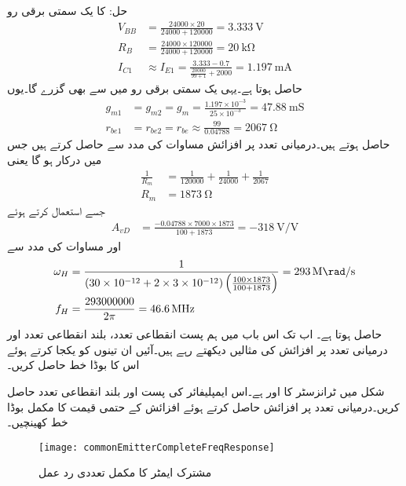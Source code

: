 حل: کا یک سمتی  برقی رو 
\begin{align*}
V_{BB}&=\frac{24000 \times 20}{24000+120000}=\SI{3.333}{\volt}\\
R_B&=\frac{24000 \times 120000}{24000+120000}=\SI{20}{\kilo \ohm}\\
I_{C1} &\approx I_{E1}=\frac{3.333-0.7}{\frac{20000}{99+1}+2000}=\SI{1.197}{\milli \ampere}
\end{align*}
حاصل ہوتا ہے۔یہی یک سمتی  برقی رو  میں سے بھی گزرے گا۔یوں
\begin{align*}
g_{m1}&=g_{m2}=g_m=\frac{1.197 \times 10^{-3}}{25 \times 10^{-3}}=\SI{47.88}{\milli \siemens}\\
r_{be1}& =r_{be2}=r_{be} \approx \frac{99}{0.04788}=\SI{2067}{\ohm}
\end{align*}
حاصل ہوتے ہیں۔درمیانی تعدد پر افزائش مساوات  کی مدد سے حاصل کرتے ہیں جس میں  درکار ہو گا یعنی
\begin{align*}
\frac{1}{R_m}&=\frac{1}{120000}+\frac{1}{24000}+\frac{1}{2067}\\
R_m&=\SI{1873}{\ohm}
\end{align*}
جسے استعمال کرتے ہوئے
\begin{align*}
A_{vD}&=\frac{-0.04788 \times 7000 \times 1873}{100+1873}=\SI{-318}{\volt \per \volt}
\end{align*}
اور مساوات  کی مدد سے
\begin{align*}
\omega_H&=\frac{1}{\left(30 \times 10^{-12}+2 \times 3 \times 10^{-12} \right) \left(\frac{100 \times 1873}{100+1873} \right)}=\SI{293}{\mega \rad \per \second}\\
f_H&=\frac{293000000}{2 \pi}=\SI{46.6}{\mega \hertz}
\end{align*}
حاصل ہوتا ہے۔
اب تک اس باب میں ہم پست انقطاعی تعدد، بلند انقطاعی تعدد اور درمیانی تعدد پر افزائش کی مثالیں دیکھتے رہے ہیں۔آئیں ان تینوں کو یکجا کرتے ہوئے اس کا بوڈا خط حاصل کریں۔
 
شکل  میں ٹرانزسٹر کا  اور  ہے۔اس ایمپلیفائر کی پست اور بلند انقطاعی تعدد حاصل کریں۔درمیانی تعدد پر افزائش حاصل کرتے ہوئے افزائش کے حتمی قیمت کا مکمل بوڈا خط کھینچیں۔
\begin{figure}
\centering
\texttt{[image: commonEmitterCompleteFreqResponse]}
\caption{مشترک ایمٹر کا مکمل تعددی رد عمل}
\label{شکل_تعددی_ردعمل_مشترک_مخارج_مکمل_تعددی_ردعمل}
\end{figure}


